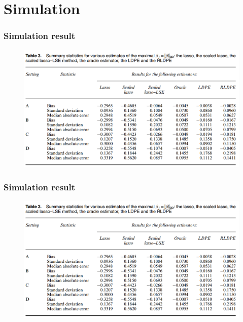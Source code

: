 \section{Simulation}
\begin{frame}
\sectionpage
\end{frame}

\begin{frame}
\frametitle{Simulation result}
\begin{figure}[h]
  \centering
  \includegraphics[width=1.0\textwidth]{./figs/Table3.png}
  \label{Table1}
\end{figure}
\end{frame}


\begin{frame}
\frametitle{Simulation result}
\begin{figure}[h]
  \centering
  \includegraphics[width=1.0\textwidth]{./figs/Table3.png}
  \label{Table1}
\end{figure}
\end{frame}
